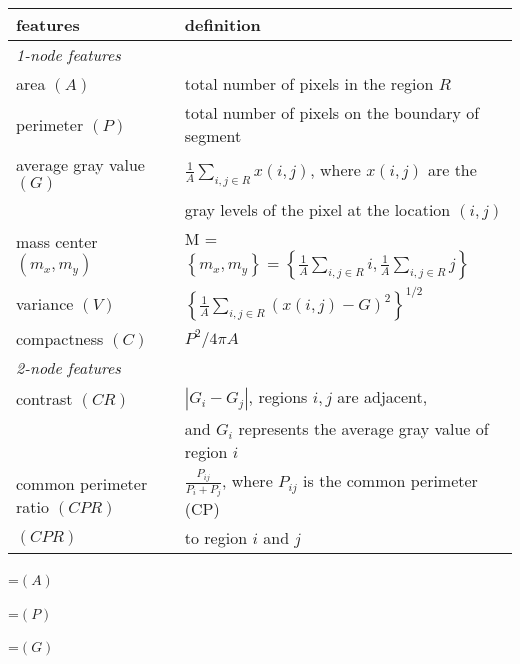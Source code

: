 {\newpage
\clearpage
\samepage \begin{table}\begin{center}
 
\begin{tabular}{||l||l||} \hline \hline
features &  definition\\  \hline \hline
{\em 1-node features} & \\  \cline{1-1}
area $(A)$ & total number of pixels in the region  $R$ \\  \hline
perimeter $(P)$ & total number of pixels on the boundary of segment \\  \hline
average gray value $(G)$& $\frac{1}{A} \sum_{i,j \in R} x(i,j) $, where
$x(i,j)$ are the\\   
& gray levels of the pixel at the
location $(i,j)$ \\  \hline
mass center $(m_x, m_y)$& M = $\left \{ m_x , m_y \right \}= \left \{
\frac{1}{A} \sum_{i,j \in R} i  ,
 \frac{1}{A} \sum_{i,j \in R} j  \right \}$ \\  \hline
variance $(V)$& $\left \{ \frac{1}{A} \sum_{i,j \in R} \left ( x(i,j) - G
\right )^2 \right \}^{1/2}$ \\  \hline
compactness $(C)$&  ${P^2}/{4 \pi A}$ \\  \hline \hline
{\em 2-node features} & \\  \cline{1-1}
contrast $(CR)$ & $| G_i - G_j|$, regions $i,j$ are adjacent, \\ 
       & and $G_i$ represents the average gray value of region $i$  \\ 
\hline
common perimeter ratio $(CPR)$ & $\frac{P_{ij}}{P_i + P_j}$, where
$P_{ij}$ is the common perimeter (CP) \\ 
$(CPR)$ & to region $i$ and $j$\\ 
\hline
\hline
\end{tabular}
\end{center}
 
 \label{tab:ii_fea_ass}
\end{table}
}

{\newpage
\clearpage
\samepage \setbox\sizebox=\hbox{$(A)$}\box\sizebox
}

{\newpage
\clearpage
\samepage \setbox\sizebox=\hbox{$(P)$}\box\sizebox
}

{\newpage
\clearpage
\samepage \setbox\sizebox=\hbox{$(G)$}\box\sizebox
}

